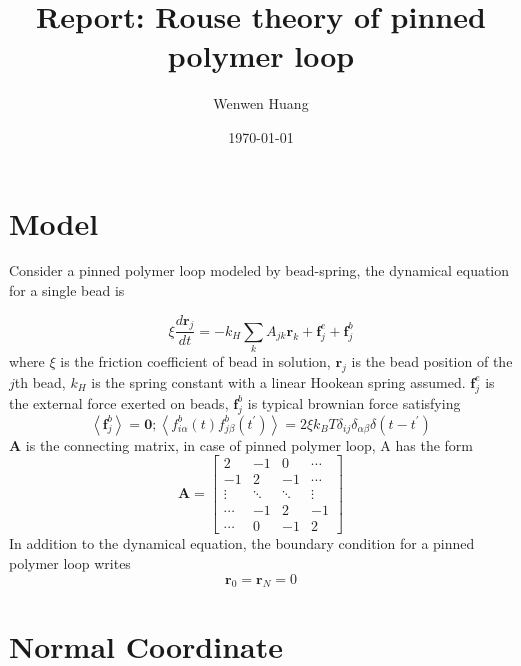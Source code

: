 \documentclass[12pt,a4paper]{article}
\begin{document}
\title{Report: Rouse theory of pinned polymer loop}
\author{Wenwen Huang}
\date{\today}

\maketitle

\section{Model}
\label{sec:model}

Consider a pinned polymer loop modeled by bead-spring, the dynamical equation
for a single bead is 

\begin{equation}
    \label{eq:bead}
    \xi \frac{d \mathbf{r}_j}{dt} = - k_H \sum_{k} A_{jk} \mathbf{r}_k + \mathbf{f}_j^e + \mathbf{f}_j^b
\end{equation}
where $\xi$ is the friction coefficient of bead in solution, $\mathbf{r}_j$ is
the bead position of the $j$th bead, $k_H$ is the spring constant with a linear
Hookean spring assumed. $\mathbf{f}_j^e$ is the external force exerted on beads,
$\mathbf{f}_j^b$ is typical brownian force satisfying 
\begin{equation}
    \label{eq:brownian}
    \left<\mathbf{f}_j^b\right> = \mathbf 0;
    \left<f_{i\alpha}^b(t)f_{j\beta}^b(t^\prime)\right> = 2\xi k_B T \delta_{ij}
    \delta_{\alpha\beta}\delta(t-t^\prime)
\end{equation}
$\mathbf A$ is the connecting matrix, in case of pinned polymer loop, A has the form
\begin{equation}
    \label{eq:connectMatrix}
    \mathbf{A} = \begin{bmatrix}
        2 & -1 & 0   & \cdots   \\
        -1 & 2 & -1  &  \cdots  \\
        \vdots & \ddots &\ddots&\vdots\\
        \cdots & -1 &2 & -1 \\
        \cdots & 0 &-1 &2
    \end{bmatrix}
\end{equation}
In addition to the dynamical equation, the boundary condition for a pinned
polymer loop writes
\begin{equation}
    \label{eq:boudary}
    \mathbf r_0 = \mathbf r_N = 0
\end{equation}

\section{Normal Coordinate}
\label{sec:normalCoordinate}
\end{document}
